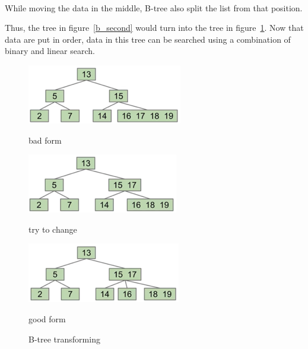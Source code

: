 \documentclass{article}
\begin{document}
\paragraph{}
While moving the data in the middle, B-tree also split the list from that position.

Thus, the tree in figure~\ref{b_second} would turn into the tree in figure~\ref{b_third}. Now that data are put in order, data in this tree can be searched using a combination of binary and linear search.

\begin{figure}[htbp]

    \centering

    \begin{minipage}{0.3\linewidth}
        \centering
        \includegraphics[width = \textwidth]{b_first.png}
        \caption{bad form}
        \label{b_first}
    \end{minipage}
    \begin{minipage}{0.3\linewidth}
        \centering
        \includegraphics[width = \textwidth]{b_second.png}
        \caption{try to change}
        \label{b_second}
    \end{minipage}
    \begin{minipage}{0.3\linewidth}
        \centering
        \includegraphics[width = \textwidth]{b_third.png}
        \caption{good form}
        \label{b_third}
    \end{minipage}

    \caption{B-tree transforming}
\end{figure}
\end{document}

